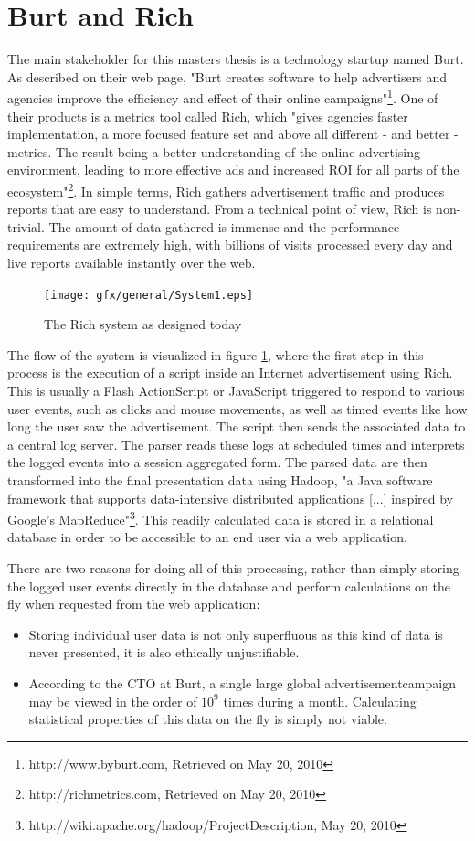 \section{Burt and Rich}
The main stakeholder for this masters thesis is a technology startup named Burt. As described on their web page, "Burt creates software to help advertisers and agencies improve the efficiency and effect of their online campaigns"\footnote{http://www.byburt.com, Retrieved on May 20, 2010}. One of their products is a metrics tool called Rich, which "gives agencies faster implementation, a more focused feature set and above all different - and better - metrics. The result being a better understanding of the online advertising environment, leading to more effective ads and increased ROI for all parts of the ecosystem"\footnote{http://richmetrics.com, Retrieved on May 20, 2010}. In simple terms, Rich gathers advertisement traffic and produces reports that are easy to understand. From a technical point of view, Rich is non-trivial. The amount of data gathered is immense and the performance requirements are extremely high, with billions of visits processed every day and live reports available instantly over the web. 

\begin{figure} [h]
    \centering
    \texttt{[image: gfx/general/System1.eps]}
    \caption{The Rich system as designed today}
    \label{fig:rich}
\end{figure}
 
The flow of the system is visualized in figure \ref{fig:rich}, where the first step in this process is the execution of a script inside an Internet advertisement using Rich. This is usually a Flash ActionScript or JavaScript triggered to respond to various user events, such as clicks and mouse movements, as well as timed events like how long the user saw the advertisement. The script then sends the associated data to a central log server. The parser reads these logs at scheduled times and interprets the logged events into a session aggregated form. The parsed data are then transformed into the final presentation data using Hadoop, "a Java software framework that supports data-intensive distributed applications [...] inspired by Google's MapReduce"\footnote{http://wiki.apache.org/hadoop/ProjectDescription, May 20, 2010}. This readily calculated data is stored in a relational database in order to be accessible to an end user via a web application.

There are two reasons for doing all of this processing, rather than simply storing the logged user events directly in the database and perform calculations on the fly when requested from the web application:
\begin{itemize}
\item Storing individual user data is not only superfluous as this kind of data is never presented, it is also ethically unjustifiable.
\item According to the CTO at Burt, a single large global advertisementcampaign may be viewed in the order of $10^9$ times during a month. Calculating statistical properties of this data on the fly is simply not viable.
\end{itemize}

